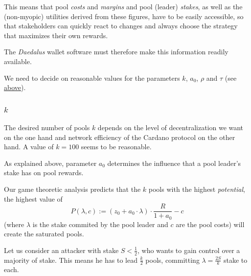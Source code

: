 \documentclass[11pt,a4paper]{article}
\begin{document}
This means that pool \emph{costs} and \emph{margins} and pool (leader)
\emph{stakes}, as well as the (non-myopic) utilities derived from these
figures, have to be easily accessible, so that stakeholders can quickly
react to changes and always choose the strategy that maximizes their own
rewards.

The \emph{Daedalus} wallet software must therefore make this information
readily available.


We need to decide on reasonable values for the parameters \(k\),
\(a_0\), \(\rho\) and \(\tau\) (see \hyperref[parameters]{above}).

\subsubsection{\texorpdfstring{\(k\)}{k}}\label{k}

The desired number of pools \(k\) depends on the level of
decentralization we want on the one hand and network efficiency of the
Cardano protocol on the other hand. A value of \(k=100\) seems to be
reasonable.


As explained above, parameter \(a_0\) determines the influence that a
pool leader's stake has on pool rewards.

Our game theoretic analysis predicts that the \(k\) pools with the
highest \emph{potential}, the highest value of \[
    P(\lambda,c):=\left(z_0+a_0\cdot\lambda\right)\cdot\frac{R}{1+a_0}-c
\] (where \(\lambda\) is the stake commited by the pool leader and \(c\)
are the pool costs) will create the saturated pools.

Let us consider an attacker with stake \(S < \frac{1}{2}\), who wants to
gain control over a majority of stake. This means he has to lead
\(\frac{k}{2}\) pools, committing \(\lambda=\frac{2S}{k}\) stake to
each.
\end{document}
